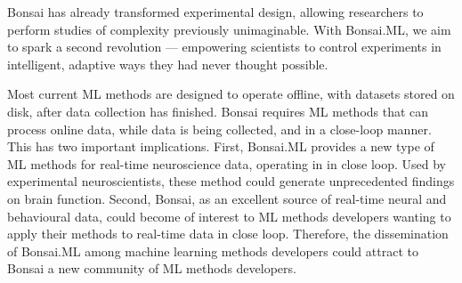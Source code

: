 Bonsai has already transformed experimental design, allowing researchers to
perform studies of complexity previously unimaginable. With Bonsai.ML, we aim
to spark a second revolution — empowering scientists to control experiments in
intelligent, adaptive ways they had never thought possible.

Most current ML methods are designed to operate offline, with datasets stored
on disk, after data collection has finished.
%
Bonsai requires ML methods that can process online data, while data is being
collected, and in a close-loop manner.
%
This has two important implications.
%
First, Bonsai.ML provides a new type of ML methods for real-time neuroscience
data, operating in in close loop. Used by experimental neuroscientists, these
method could generate unprecedented findings on brain function.
%
Second, Bonsai, as an excellent source of real-time neural and behavioural data,
could become of interest to ML methods developers wanting to apply their
methods to real-time data in close loop.
%
Therefore, the dissemination of Bonsai.ML among machine learning methods
developers could attract to Bonsai a new community of ML methods developers.
